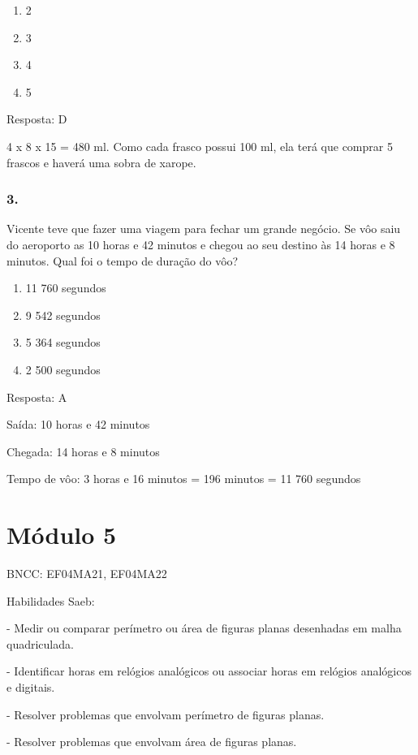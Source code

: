 \begin{enumerate}
\def\labelenumi{\alph{enumi})}
\item
  2
\item
  3
\item
  4
\item
  5
\end{enumerate}

Resposta: D

4 x 8 x 15 = 480 ml. Como cada frasco possui 100 ml, ela terá que
comprar 5 frascos e haverá uma sobra de xarope.

\subsubsection{3.}\label{section-51}

Vicente teve que fazer uma viagem para fechar um grande negócio. Se vôo
saiu do aeroporto as 10 horas e 42 minutos e chegou ao seu destino às 14
horas e 8 minutos. Qual foi o tempo de duração do vôo?

\begin{enumerate}
\def\labelenumi{\alph{enumi})}
\item
  11 760 segundos
\item
  9 542 segundos
\item
  5 364 segundos
\item
  2 500 segundos
\end{enumerate}

Resposta: A

Saída: 10 horas e 42 minutos

Chegada: 14 horas e 8 minutos

Tempo de vôo: 3 horas e 16 minutos = 196 minutos = 11 760 segundos

\section{Módulo 5}\label{muxf3dulo-5}

BNCC: EF04MA21, EF04MA22

Habilidades Saeb:

- Medir ou comparar perímetro ou área de figuras planas desenhadas em
malha quadriculada.

- Identificar horas em relógios analógicos ou associar horas em relógios
analógicos e digitais.

- Resolver problemas que envolvam perímetro de figuras planas.

- Resolver problemas que envolvam área de figuras planas.

